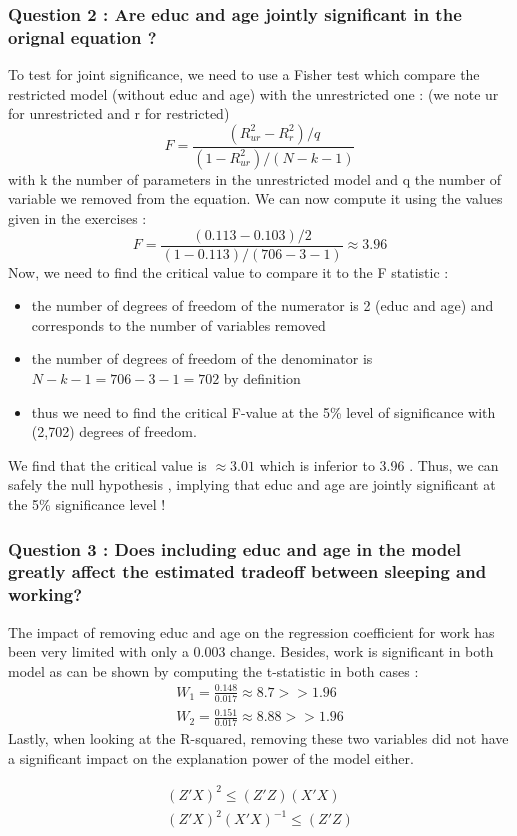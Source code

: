 \documentclass{article}
\begin{document}
\subsubsection{Question 2 : Are educ and age jointly significant in the orignal equation ?}
To test for joint significance, we need to use a Fisher test which compare the restricted model (without educ and age) with the unrestricted one : (we note ur for unrestricted and r for restricted)
\begin{equation}
    F = \frac{(R^2_{ur}-R^2_r)/q}{(1-R^2_{ur})/(N-k-1)} 
\end{equation}
with k the number of parameters in the unrestricted model and q the number of variable we removed from the equation. 
We can now compute it using the values given in the exercises : 
\begin{equation}
    F = \frac{(0.113-0.103)/2}{(1-0.113)/(706-3-1)} \approx 3.96
\end{equation}
Now, we need to find the critical value to compare it to the F statistic : 
\begin{itemize}
    \item the number of degrees of freedom of the numerator is 2 (educ and age) and corresponds to the number of variables removed
    \item the number of degrees of freedom of the denominator is $N-k-1 = 706 - 3 - 1 = 702$ by definition
    \item thus we need to find the critical F-value at the 5\% level of significance with (2,702) degrees of freedom.
\end{itemize}
We find that the critical value is $\approx 3.01$ which is inferior to 3.96 .
Thus, we can safely the null hypothesis , implying that educ and age are  jointly significant at the 5\% significance level !


\subsubsection{Question 3 : Does including educ and age in the model greatly affect the estimated tradeoff between sleeping and working?}
The impact of removing educ and age on the regression coefficient for work has been very limited with only a 0.003 change. 
Besides, work is significant in both model as can be shown by computing the t-statistic in both cases : 
\begin{equation}
\begin{aligned}
    W_1 = \frac{0.148}{0.017} \approx 8.7 >> 1.96\\
    W_2 = \frac{0.151}{0.017} \approx 8.88 >> 1.96 
\end{aligned}
\end{equation}
Lastly, when looking at the R-squared, removing these two variables did not have a significant impact on the explanation power of the model either. 


\begin{equation}
\begin{aligned}
    (Z'X)^2 \leq (Z'Z)(X'X)\\
    (Z'X)^2(X'X)^{-1} \leq (Z'Z)
\end{aligned}
\end{equation}
\end{document}
